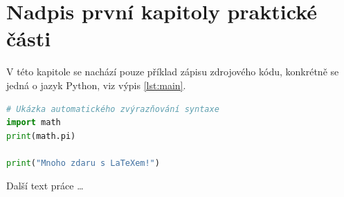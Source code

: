 
\section{Nadpis první kapitoly praktické části}

V této kapitole se nachází pouze příklad zápisu zdrojového kódu, konkrétně se jedná o jazyk Python, viz výpis \ref{lst:main}.

\begin{lstlisting}[language=Python,caption=Výpis zdrojového kódu, label=lst:main]
# Ukázka automatického zvýrazňování syntaxe
import math
print(math.pi)

print("Mnoho zdaru s LaTeXem!")
\end{lstlisting}

\noindent
Další text práce \dots


